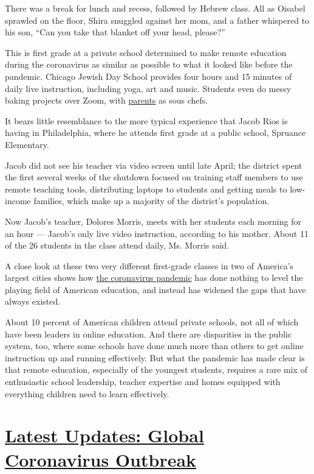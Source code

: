 There was a break for lunch and recess, followed by Hebrew class. All as
Oisabel sprawled on the floor, Shira snuggled against her mom, and a
father whispered to his son, ``Can you take that blanket off your head,
please?''

This is first grade at a private school determined to make remote
education during the coronavirus as similar as possible to what it
looked like before the pandemic. Chicago Jewish Day School provides four
hours and 15 minutes of daily live instruction, including yoga, art and
music. Students even do messy baking projects over Zoom, with
\href{https://www.nytimes.com/2020/05/10/us/coronavirus-giving-birth-new-mothers.html}{parents}
as sous chefs.

It bears little resemblance to the more typical experience that Jacob
Rios is having in Philadelphia, where he attends first grade at a public
school, Spruance Elementary.

Jacob did not see his teacher via video screen until late April; the
district spent the first several weeks of the shutdown focused on
training staff members to use remote teaching tools, distributing
laptops to students and getting meals to low-income families, which make
up a majority of the district's population.

Now Jacob's teacher, Dolores Morris, meets with her students each
morning for an hour --- Jacob's only live video instruction, according
to his mother. About 11 of the 26 students in the class attend daily,
Ms. Morris said.

A close look at these two very different first-grade classes in two of
America's largest cities shows how
\href{https://www.nytimes.com/news-event/coronavirus}{the coronavirus
pandemic} has done nothing to level the playing field of American
education, and instead has widened the gaps that have always existed.

About 10 percent of American children attend private schools, not all of
which have been leaders in online education. And there are disparities
in the public system, too, where some schools have done much more than
others to get online instruction up and running effectively. But what
the pandemic has made clear is that remote education, especially of the
youngest students, requires a rare mix of enthusiastic school
leadership, teacher expertise and homes equipped with everything
children need to learn effectively.

\hypertarget{latest-updates-global-coronavirus-outbreak}{%
\section{\texorpdfstring{\href{https://www.nytimes.com/2020/08/04/world/coronavirus-cases.html?action=click\&pgtype=Article\&state=default\&region=MAIN_CONTENT_1\&context=storylines_live_updates}{Latest
Updates: Global Coronavirus
Outbreak}}{Latest Updates: Global Coronavirus Outbreak}}\label{latest-updates-global-coronavirus-outbreak}}


